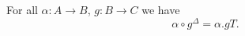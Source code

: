 For all $\alpha: A \longrightarrow B$, $g: B \longrightarrow C$ we have
$$\alpha \circ g^\Delta = \alpha.gT.$$
